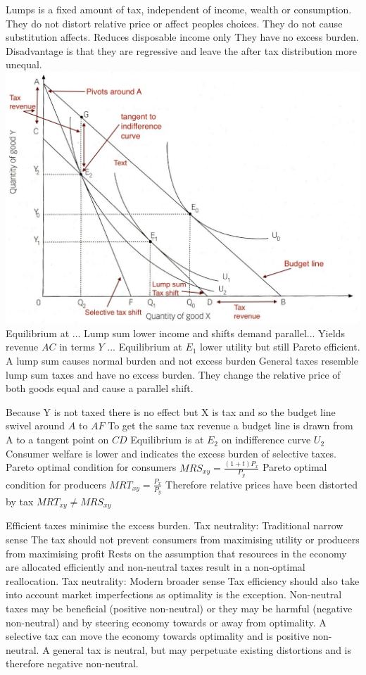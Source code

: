 \documentclass[12pt]{examnotes}
\begin{document}
\ra Lumps is a fixed amount of tax, independent of income, wealth or consumption.
\ra They do not distort relative price or affect peoples choices.
\ra They do not cause substitution affects.
\ra  Reduces disposable income only
\ra They have no excess burden.
\ra Disadvantage is that they are regressive and leave the after tax distribution more unequal.
\includegraphics[scale=0.4]{./imgs/111.jpg}
\ra Equilibrium at ...
\ra Lump sum lower income and shifts demand parallel...
\ra Yields revenue $AC$ in terms $Y$ ...
\ra Equilibrium at $E_1$ lower utility but still Pareto efficient.
\ra A lump sum causes normal burden and not excess burden
\ra General taxes resemble lump sum taxes and have no excess burden. They change the relative price of both goods equal and cause a  parallel shift.

\ra Because Y is not taxed there is no effect but X is tax and so the budget line swivel around $A$ to $AF$
\ra To get the same tax revenue a budget line is drawn from A to a tangent point on $CD$
\ra Equilibrium is at $E_2$ on indifference curve $U_2$
\ra Consumer welfare is lower and indicates the excess burden of selective taxes.
\ra Pareto optimal condition for consumers $MRS_{xy}=\frac{(1+t)P_x}{P_y}$
\ra Pareto optimal condition for producers $MRT_{xy}=\frac{P_x}{P_y}$
\ra Therefore relative prices have been distorted by tax $MRT_{xy} \ne MRS_{xy}$

\ra Efficient taxes minimise the excess burden.
 Tax neutrality: Traditional narrow sense
\rna The tax should not prevent consumers from maximising utility or producers from maximising profit
\rna Rests on the assumption that resources in the economy are allocated efficiently and non-neutral taxes result in a non-optimal reallocation.
 Tax neutrality: Modern broader sense
\rna Tax efficiency should also take into account market imperfections as optimality is the exception.
\rna Non-neutral taxes may be beneficial (positive non-neutral) or they may be harmful (negative non-neutral) and by steering economy towards or away from optimality.
\rna A selective tax can move the economy towards optimality and is positive non-neutral.
\rna A general tax is neutral, but may perpetuate existing distortions and is therefore negative non-neutral.
\end{document}
